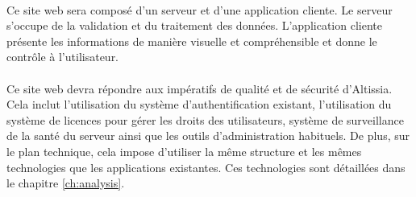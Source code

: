 \paragraph{}
Ce site web sera composé d'un serveur et d'une application cliente.
Le serveur s'occupe de la validation et du traitement des données.
L'application cliente présente les informations de manière visuelle et compréhensible et donne le contrôle à l'utilisateur.

\paragraph{}
Ce site web devra répondre aux impératifs de qualité et de sécurité d'Altissia.
Cela inclut l'utilisation du système d'authentification existant, l'utilisation du système de licences\fnmark{} pour gérer les droits des utilisateurs, système de surveillance de la santé du serveur ainsi que les outils d'administration habituels. %
De plus, sur le plan technique, cela impose d'utiliser la même structure et les mêmes technologies que les applications existantes.
Ces technologies sont détaillées dans le chapitre \ref{ch:analysis}.
